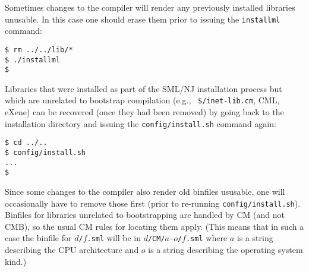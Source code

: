 Sometimes changes to the compiler will render any previously installed
libraries unusable.  In this case one should erase them prior to
issuing the {\tt installml} command:

\begin{verbatim}
$ rm ../../lib/*
$ ./installml
$
\end{verbatim}

Libraries that were installed as part of the SML/NJ installation
process but which are unrelated to bootstrap compilation (e.g., {\tt
\$/inet-lib.cm}, CML, eXene) can be recovered (once they had been
removed) by going back to the installation directory and issuing the
{\tt config/install.sh} command again:

\begin{verbatim}
$ cd ../..
$ config/install.sh
...
$
\end{verbatim}

Since some changes to the compiler also render old binfiles ususable,
one will occasionally have to remove those first (prior to re-running
{\tt config/install.sh}).  Binfiles for libraries unrelated to
bootstrapping are handled by CM (and not CMB), so the usual CM rules
for locating them apply.  (This means that in such a case the binfile
for {\tt $d$/$f$.sml} will be in {\tt $d$/CM/$a$-$o$/$f$.sml} where
$a$ is a string describing the CPU architecture and $o$ is a string
describing the operating system kind.)
